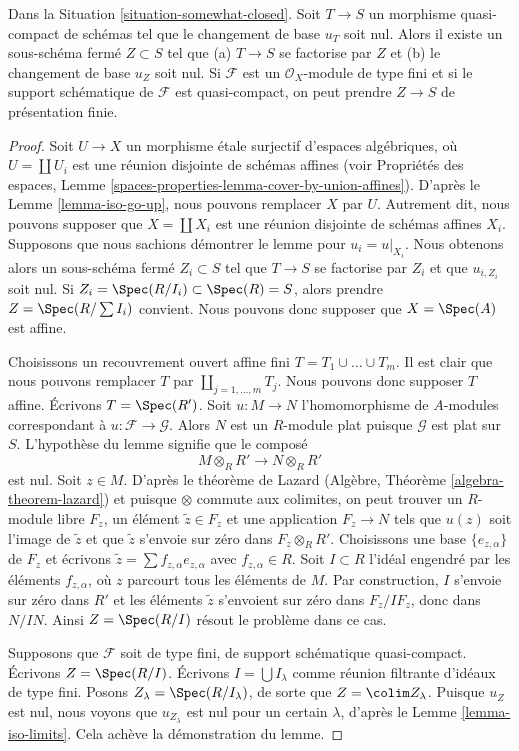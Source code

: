 \begin{lemma}
\label{lemma-F-zero-somewhat-closed}
Dans la Situation \ref{situation-somewhat-closed}. Soit $T \to S$
un morphisme quasi-compact de schémas tel que le changement de base $u_T$ soit
nul. Alors il existe un sous-schéma fermé $Z \subset S$ tel que
(a) $T \to S$ se factorise par $Z$ et (b) le changement de base $u_Z$ soit nul.
Si $\mathcal{F}$ est un $\mathcal{O}_X$-module de type fini et si
le support schématique de $\mathcal{F}$ est quasi-compact,
on peut prendre $Z \to S$ de présentation finie.
\end{lemma}

\begin{proof}
Soit $U \to X$ un morphisme \'etale surjectif d'espaces algébriques,
où $U = \coprod U_i$ est une réunion disjointe de schémas affines (voir
Propriétés des espaces, Lemme
\ref{spaces-properties-lemma-cover-by-union-affines}).
D'après le Lemme \ref{lemma-iso-go-up}, nous pouvons
remplacer $X$ par $U$. Autrement dit, nous pouvons supposer que $X = \coprod X_i$
est une réunion disjointe de schémas affines $X_i$. Supposons que nous sachions démontrer
le lemme pour $u_i = u|_{X_i}$. Nous obtenons alors un sous-schéma fermé
$Z_i \subset S$ tel que $T \to S$ se factorise par $Z_i$ et que
$u_{i, Z_i}$ soit nul. Si
$Z_i = \Spec(R/I_i) \subset \Spec(R) = S$, alors prendre
$Z = \Spec(R/\sum I_i)$ convient. Nous pouvons donc supposer que
$X = \Spec(A)$ est affine.

\medskip\noindent
Choisissons un recouvrement ouvert affine fini $T = T_1 \cup \ldots \cup T_m$.
Il est clair que nous pouvons remplacer $T$ par $\coprod_{j = 1, \ldots, m} T_j$.
Nous pouvons donc supposer $T$ affine. Écrivons $T = \Spec(R')$.
Soit $u : M \to N$ l'homomorphisme de $A$-modules
correspondant à $u : \mathcal{F} \to \mathcal{G}$.
Alors $N$ est un $R$-module plat puisque $\mathcal{G}$ est plat sur $S$.
L'hypothèse du lemme signifie que le composé
$$
M \otimes_R R' \to N \otimes_R R'
$$
est nul. Soit $z \in M$. D'après le théorème de Lazard
(Algèbre, Théorème \ref{algebra-theorem-lazard}) et puisque
$\otimes$ commute aux colimites, on peut trouver un $R$-module libre
$F_z$, un élément $\tilde z \in F_z$ et une application $F_z \to N$ tels que
$u(z)$ soit l'image de $\tilde z$ et que $\tilde z$ s'envoie sur zéro dans
$F_z \otimes_R R'$. Choisissons une base $\{e_{z, \alpha}\}$ de $F_z$ et écrivons
$\tilde z = \sum f_{z, \alpha} e_{z, \alpha}$ avec $f_{z, \alpha} \in R$.
Soit $I \subset R$ l'idéal engendré par les éléments $f_{z, \alpha}$,
où $z$ parcourt tous les éléments de $M$.
Par construction, $I$ s'envoie sur zéro dans $R'$ et les éléments $\tilde z$
s'envoient sur zéro dans $F_z/IF_z$, donc dans $N/IN$. Ainsi $Z = \Spec(R/I)$
résout le problème dans ce cas.

\medskip\noindent
Supposons que $\mathcal{F}$ soit de type fini, de support schématique
quasi-compact. Écrivons $Z = \Spec(R/I)$.
Écrivons $I = \bigcup I_\lambda$ comme réunion filtrante d'idéaux de type fini.
Posons $Z_\lambda = \Spec(R/I_\lambda)$, de sorte que $Z = \colim Z_\lambda$.
Puisque $u_Z$ est nul, nous voyons que $u_{Z_\lambda}$ est nul
pour un certain $\lambda$, d'après le Lemme \ref{lemma-iso-limits}.
Cela achève la démonstration du lemme.
\end{proof}

